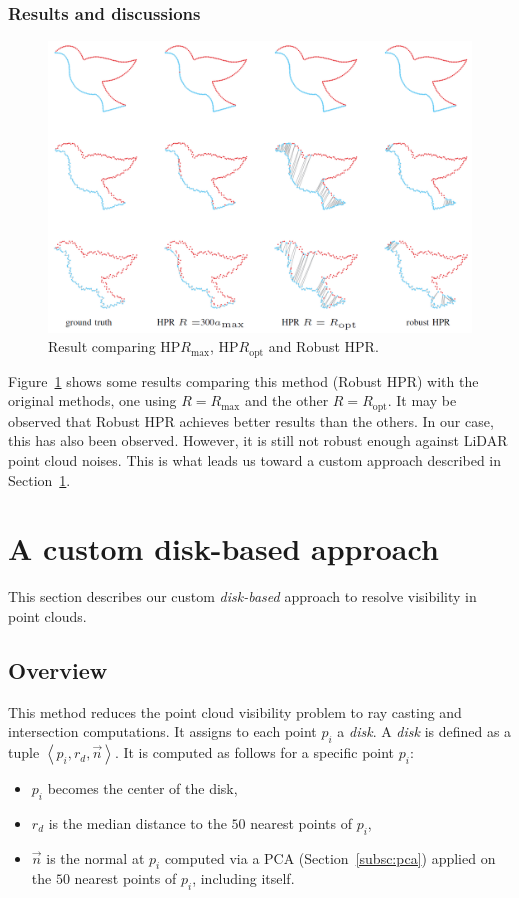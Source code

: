 \subsubsection{Results and discussions}
\begin{figure}
  \centering
  \includegraphics[scale=0.35]{img/rhpr-result.png}
  \caption{Result comparing HP$R_\text{max}$, HP$R_\text{opt}$ and Robust HPR.}
  \label{fig:rhpr-result}
\end{figure}

Figure~\ref{fig:rhpr-result} shows some results comparing this method (Robust HPR) with the original methods, one using $R = R_\text{max}$ and the other $R = R_\text{opt}$. It may be observed that Robust HPR achieves better results than the others. In our case, this has also been observed. However, it is still not robust enough against LiDAR point cloud noises. This is what leads us toward a custom approach described in Section~\ref{sc:custom}.

\section{A custom disk-based approach}
\label{sc:custom}
This section describes our custom \emph{disk-based} approach to resolve visibility in point clouds.

\subsection{Overview}
\label{subsc:custom-overview}
This method reduces the point cloud visibility problem to ray casting and intersection computations. It assigns to each point $p_i$ a \emph{disk}. A \emph{disk} is defined as a tuple $\left\langle p_i, r_d, \vec{n} \right\rangle$. It is computed as follows for a specific point $p_i$:
\begin{itemize}
  \item $p_i$ becomes the center of the disk,
  \item $r_d$ is the median distance to the $50$ nearest points of $p_i$,
  \item $\vec{n}$ is the normal at $p_i$ computed via a PCA (Section~\ref{subsc:pca}) applied on the $50$ nearest points of $p_i$, including itself.
\end{itemize}

